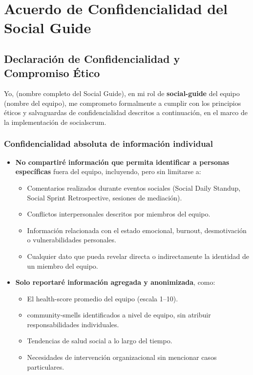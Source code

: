 \chapter{Acuerdo de Confidencialidad del Social Guide}
\label{anexo:confidencialidad}

\section[Declaración de Confidencialidad]{Declaración de Confidencialidad y\\Compromiso Ético}

Yo, \underline{\hspace{6cm}} (nombre completo del Social Guide), en mi rol de \textbf{\gls{social-guide}} del equipo \underline{\hspace{5cm}} (nombre del equipo), me comprometo formalmente a cumplir con los principios éticos y salvaguardas de confidencialidad descritos a continuación, en el marco de la implementación de \gls{socialscrum}.

\subsection{Confidencialidad absoluta de información individual}

\begin{itemize}
    \item \textbf{No compartiré información que permita identificar a personas específicas} fuera del equipo, incluyendo, pero sin limitarse a:
          \begin{itemize}
              \item Comentarios realizados durante eventos sociales (Social Daily Standup, Social Sprint Retrospective, sesiones de mediación).
              \item Conflictos interpersonales descritos por miembros del equipo.
              \item Información relacionada con el estado emocional, \gls{burnout}, desmotivación o vulnerabilidades personales.
              \item Cualquier dato que pueda revelar directa o indirectamente la identidad de un miembro del equipo.
          \end{itemize}

    \item \textbf{Solo reportaré información agregada y anonimizada}, como:
          \begin{itemize}
              \item El \gls{health-score} promedio del equipo (escala 1–10).
              \item \gls{community-smells} identificados a nivel de equipo, sin atribuir responsabilidades individuales.
              \item Tendencias de salud social a lo largo del tiempo.
              \item Necesidades de intervención organizacional sin mencionar casos particulares.
          \end{itemize}
\end{itemize}

